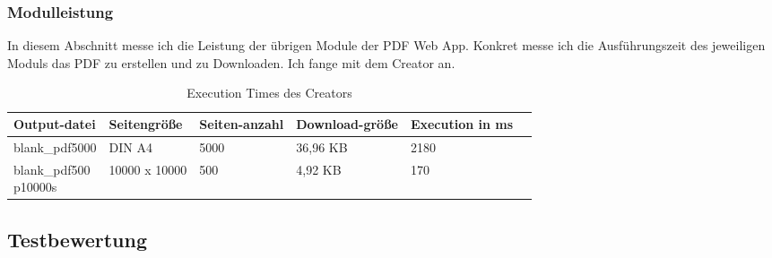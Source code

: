 \subsubsection{Modulleistung}
In diesem Abschnitt messe ich die Leistung der übrigen Module der PDF Web App. Konkret messe ich die Ausführungszeit des jeweiligen Moduls das PDF zu erstellen und zu Downloaden. Ich fange mit dem Creator an.

\begin{table}[!htbp]
	\centering
	\begin{tabular}{|p{3cm}|p{2cm}|p{2cm}|p{2cm}|p{2cm}|p{2cm}|}
		\hline
		\textbf{Output-datei}					& \textbf{Seitengröße}	& \textbf{Seiten-anzahl}	& \textbf{Download-größe}	& \textbf{Execution in ms} 	\\ 
		\hline
		blank\_pdf5000							& DIN A4 				& 5000 						& 36,96 KB 					& 2180  					\\
		\parbox[t]{4cm}{blank\_pdf500\\p10000s}	& 10000 x 10000			& 500 						& 4,92 KB					& 170 						\\
		\hline
	\end{tabular}
	\caption{Execution Times des Creators}
	\label{table:creator-dur}
\end{table}

\subsection{Testbewertung}